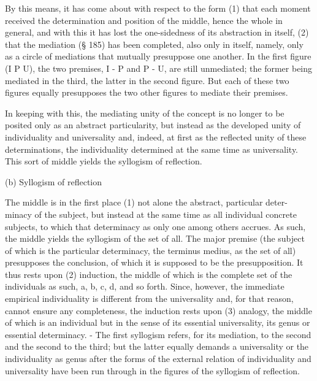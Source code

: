 By this means, it has come about with respect to the form (1) that each
moment received the determination and position of the middle, hence
the whole in general, and with this it has lost the one-sidedness of its
abstraction in itself, (2) that the mediation (§ 185) has been
completed, also only in itself, namely, only as a circle of mediations that
mutually presuppose one another. In the first figure (I P U), the two
premises, I - P and P - U, are still unmediated; the former being mediated
in the third, the latter in the second figure. But each of these two figures
equally presupposes the two other figures to mediate their premises.

In keeping with this, the mediating unity of the concept is no longer
to be posited only as an abstract particularity, but instead as the developed
unity of individuality and universality and, indeed, at first as the reflected
unity of these determinations, the individuality determined at the same time
as universality. This sort of middle yields the syllogism of reflection.

(b) Syllogism of reflection

The middle is in the first place (1) not alone the abstract, particular deter-
minacy of the subject, but instead at the same time as all individual concrete
subjects, to which that determinacy as only one among others accrues. As
such, the middle yields the syllogism of the set of all.
The major premise (the subject of which is the particular determinacy, the
terminus medius, as the set of all) presupposes the conclusion, of which it
is supposed to be the presupposition. It thus rests upon (2) induction, the
middle of which is the complete set of the individuals as such, a,
b, c, d, and so forth. Since, however, the immediate empirical individuality
is different from the universality and, for that reason, cannot ensure any
completeness, the induction rests upon (3) analogy, the middle of which
is an individual but in the sense of its essential universality, its genus or
essential determinacy. - The first syllogism refers, for its mediation, to
the second and the second to the third; but the latter equally demands a
universality or the individuality as genus after the forms of the external
relation of individuality and universality have been run through in the
figures of the syllogism of reflection.

